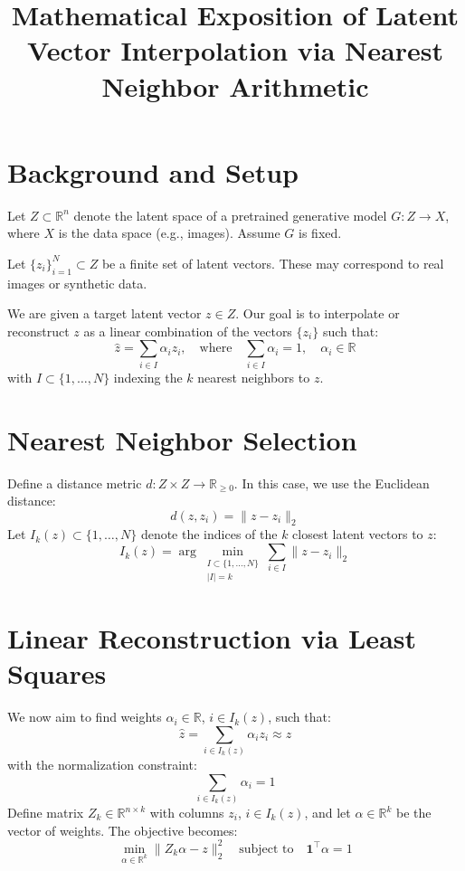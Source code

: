 \documentclass[a4paper,12pt]{article}
\begin{document}
\title{Mathematical Exposition of Latent Vector Interpolation via Nearest Neighbor Arithmetic}
\author{}
\date{}
\maketitle

\section{Background and Setup}
Let $Z \subset \mathbb{R}^n$ denote the latent space of a pretrained generative model $G: Z \to X$, where $X$ is the data space (e.g., images). Assume $G$ is fixed.

Let $\{z_i\}_{i=1}^N \subset Z$ be a finite set of latent vectors. These may correspond to real images or synthetic data.

We are given a target latent vector $z \in Z$. Our goal is to interpolate or reconstruct $z$ as a linear combination of the vectors $\{z_i\}$ such that:
\[
\hat{z} = \sum_{i \in I} \alpha_i z_i, \quad \text{where} \quad \sum_{i \in I} \alpha_i = 1, \quad \alpha_i \in \mathbb{R}
\]
with $I \subset \{1, \dots, N\}$ indexing the $k$ nearest neighbors to $z$.

\section{Nearest Neighbor Selection}
Define a distance metric $d: Z \times Z \to \mathbb{R}_{\geq 0}$. In this case, we use the Euclidean distance:
\[
d(z, z_i) = \|z - z_i\|_2
\]
Let $I_k(z) \subset \{1, \dots, N\}$ denote the indices of the $k$ closest latent vectors to $z$:
\[
I_k(z) = \arg\min_{\substack{I \subset \{1, \dots, N\} \\ |I| = k}} \sum_{i \in I} \|z - z_i\|_2
\]

\section{Linear Reconstruction via Least Squares}
We now aim to find weights $\alpha_i \in \mathbb{R}$, $i \in I_k(z)$, such that:
\[
\hat{z} = \sum_{i \in I_k(z)} \alpha_i z_i \approx z
\]
with the normalization constraint:
\[
\sum_{i \in I_k(z)} \alpha_i = 1
\]
Define matrix $Z_k \in \mathbb{R}^{n \times k}$ with columns $z_i$, $i \in I_k(z)$, and let $\alpha \in \mathbb{R}^k$ be the vector of weights. The objective becomes:
\[
\min_{\alpha \in \mathbb{R}^k} \|Z_k \alpha - z\|_2^2 \quad \text{subject to} \quad \mathbf{1}^\top \alpha = 1
\]
\end{document}

